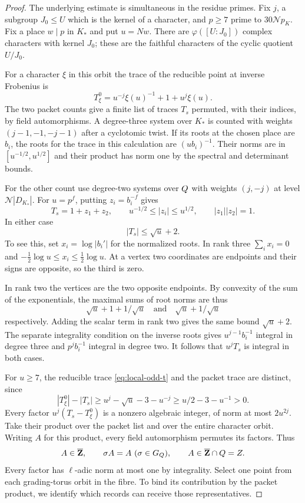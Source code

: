 \begin{proof}

The underlying estimate is simultaneous in the residue primes.
Fix \(j\), a subgroup \(J_0\le U\) which is the kernel of a
character, and \(p\ge7\) prime to \(30\mathcal N p_K\).
Fix a place \(w\mid p\) in \(K_*\) and put \(u=Nw\).
There are \(\varphi([U:J_0])\) complex characters with
kernel \(J_0\); these are the faithful characters of the cyclic
quotient \(U/J_0\).

For a character \(\xi\) in this orbit the trace of the reducible
point at inverse Frobenius is
\[
                T^0_\xi=u^{-j}\xi(u)^{-1}+1+u^j\xi(u).
 \tag{T}\label{eq:local-odd-t}
\]
The two packet counts give a finite list of traces \(T_s\)
permuted, with their indices, by field automorphisms. A
degree-three system over \(K_*\) is counted with weights
\((j-1,-1,-j-1)\) after a cyclotomic twist. If its roots
at the chosen place are \(b_i\), the roots for the trace
in this calculation are \((ub_i)^{-1}\).
Their norms are in \([u^{-1/2},u^{1/2}]\) and their
product has norm one by the spectral and determinant bounds.


For the other count use degree-two systems over \(Q\)
with weights \((j,-j)\) at level \(\mathcal N |D_{K_*}|\).
For \(u=p^f\), putting \(z_i=b_i^{-f}\) gives
\[
 T_s=1+z_1+z_2,\qquad u^{-1/2}\le |z_i|\le u^{1/2},\qquad
 |z_1||z_2|=1 .
\] In either case
\[
                  |T_s|\le \sqrt u+2.
\]
To see this, set \(x_i=\log|b_i'|\) for the normalized
roots. In rank three \(\sum_i x_i=0\) and
\(-\tfrac12\log u\le x_i\le\tfrac12\log u\).
At a vertex two coordinates are endpoints and their signs are
opposite, so the third is zero.

In rank two the vertices are
the two opposite endpoints. By convexity of the sum of the
exponentials, the maximal sums of root norms are thus
\[
          \sqrt u+1+1/\sqrt u
      \quad\text{and}\quad \sqrt u+1/\sqrt u
\]
respectively. Adding the scalar term in rank two gives the
same bound \(\sqrt u+2\). The separate integrality condition on the inverse roots gives
\(u^{j-1}b_i^{-1}\) integral in degree three and \(p^j b_i^{-1}\)
integral in degree two. It follows that \(u^jT_s\) is integral
in both cases.

For \(u\ge7\), the reducible trace \eqref{eq:local-odd-t} and the packet trace
are distinct, since
\[
 |T^0_\xi|-|T_s|\ge u^j-\sqrt u-3-u^{-j}
                  \ge u/2-3-u^{-1}>0 .
\]
Every factor \(u^j(T_s-T^0_\xi)\) is a nonzero algebraic
integer, of norm at most \(2u^{2j}\). Take their product over the
packet list and over the entire character orbit. Writing \(A\) for this product, every field automorphism permutes its factors. Thus
\[
 A\in\overline{\mathbf Z},\qquad \sigma A=A\ (\sigma\in G_\Q),
 \qquad A\in\overline{\mathbf Z}\cap\Q=\Z .
\] Every factor has \(\ell\)-adic norm at most one by integrality.
Select one point from each grading-torus orbit in the fibre. To bind
its contribution by the packet product, we identify which records can
receive those representatives.


\end{proof}
